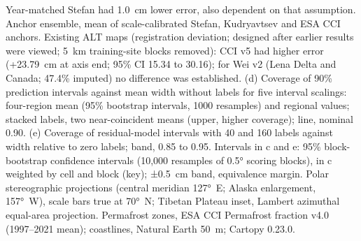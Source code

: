 Year-matched Stefan had 1.0~cm lower error, also dependent on that assumption.
Anchor ensemble, mean of scale-calibrated Stefan, Kudryavtsev and ESA CCI anchors.
Existing ALT maps (registration deviation; designed after earlier results were viewed; 5~km training-site blocks removed): CCI v5 had higher error (+23.79~cm at axis end; 95\% CI 15.34 to 30.16); for Wei v2 (Lena Delta and Canada; 47.4\% imputed) no difference was established.
(d) Coverage of 90\% prediction intervals against mean width without labels for five interval scalings: four-region mean (95\% bootstrap intervals, 1000 resamples) and regional values; stacked labels, two near-coincident means (upper, higher coverage); line, nominal 0.90.
(e) Coverage of residual-model intervals with 40 and 160 labels against width relative to zero labels; band, 0.85 to 0.95.
Intervals in c and e: 95\% block-bootstrap confidence intervals (10,000 resamples of 0.5° scoring blocks), in c weighted by cell and block (key); ±0.5~cm band, equivalence margin.
Polar stereographic projections (central meridian 127°~E; Alaska enlargement, 157°~W), scale bars true at 70°~N; Tibetan Plateau inset, Lambert azimuthal equal-area projection.
Permafrost zones, ESA CCI Permafrost fraction v4.0 (1997--2021 mean); coastlines, Natural Earth 50~m; Cartopy 0.23.0.

\medskip

